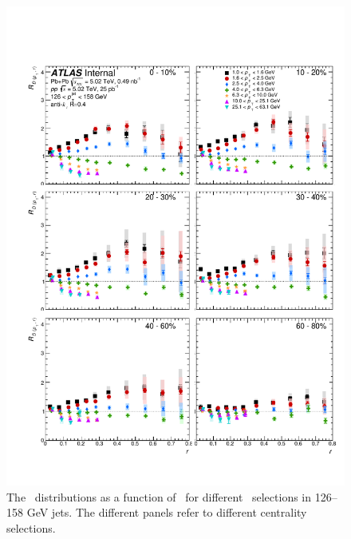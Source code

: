 \begin{figure}[h]
\includegraphics[width=1.0\textwidth]{figures/results/RDpT_dR_jet7}
\caption{The \RDptr\ distributions as a function of \rvar\ for different \pt\ selections in 126--158 GeV jets.
The different panels refer to different centrality selections.}
\label{fig:fullset_rptr_j7}
\end{figure}

